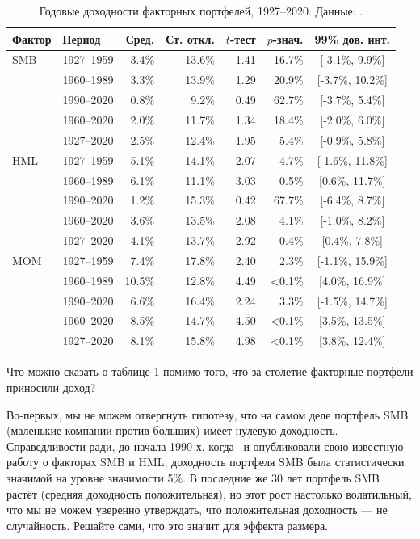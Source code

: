 \begin{table}[ht]
\centering
\begin{tabular}{l|l|r|r|r|r|c}
Фактор & Период & Сред. & Ст. откл. & $t$-тест & $p$-знач. & 99\% дов. инт. \\
\hline
SMB & 1927--1959 &  3.4\% & 13.6\% & 1.41 & 16.7\% & [-3.1\%, 9.9\%]  \\    
    & 1960--1989 &  3.3\% & 13.9\% & 1.29 & 20.9\% & [-3.7\%, 10.2\%] \\
    & 1990--2020 &  0.8\% &  9.2\% & 0.49 & 62.7\% & [-3.7\%, 5.4\%]  \\ 
    & 1960--2020 &  2.0\% & 11.7\% & 1.34 & 18.4\% & [-2.0\%, 6.0\%]  \\
    & 1927--2020 &  2.5\% & 12.4\% & 1.95 &  5.4\% & [-0.9\%, 5.8\%]  \\ \hline
    
HML & 1927--1959 &  5.1\% & 14.1\% & 2.07 &  4.7\% & [-1.6\%, 11.8\%] \\
    & 1960--1989 &  6.1\% & 11.1\% & 3.03 &  0.5\% & [0.6\%, 11.7\%] \\  
    & 1990--2020 &  1.2\% & 15.3\% & 0.42 & 67.7\% & [-6.4\%, 8.7\%]  \\
    & 1960--2020 &  3.6\% & 13.5\% & 2.08 &  4.1\% & [-1.0\%, 8.2\%]  \\ 
    & 1927--2020 &  4.1\% & 13.7\% & 2.92 &  0.4\% & [0.4\%, 7.8\%]  \\ \hline
      
MOM & 1927--1959 &  7.4\% & 17.8\% & 2.40 &  2.3\% & [-1.1\%, 15.9\%] \\ 
    & 1960--1989 & 10.5\% & 12.8\% & 4.49 & <0.1\% & [4.0\%, 16.9\%] \\
    & 1990--2020 &  6.6\% & 16.4\% & 2.24 &  3.3\% & [-1.5\%, 14.7\%] \\ 
    & 1960--2020 &  8.5\% & 14.7\% & 4.50 & <0.1\% & [3.5\%, 13.5\%] \\ 
    & 1927--2020 &  8.1\% & 15.8\% & 4.98 & <0.1\% & [3.8\%, 12.4\%] \\ 
\end{tabular}
\caption{Годовые доходности факторных портфелей, 1927--2020. Данные: 
\cite{kennethFrench}.}
\label{us_factor_returns_table}
\end{table}

Что можно сказать о таблице \ref{us_factor_returns_table} помимо того, что за 
столетие факторные портфели приносили доход?

Во-первых, мы не можем отвергнуть гипотезу, что на самом деле портфель SMB 
(маленькие компании против больших) имеет нулевую доходность. Справедливости 
ради, до начала 1990-х, когда \ и 
 опубликовали свою известную 
работу \cite{Fama93commonrisk} о факторах SMB и HML, доходность портфеля SMB 
была статистически значимой на уровне значимости 5\%. В последние же 30 лет 
портфель SMB растёт (средняя доходность положительная), но этот рост настолько 
волатильный, что мы не можем уверенно утверждать, что положительная доходность 
--- не случайность. Решайте сами, что это значит для эффекта размера.

